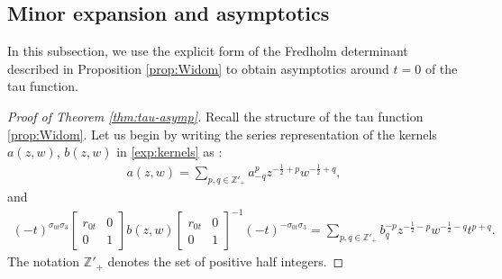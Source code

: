 \documentclass[a4paper,reqno,11pt]{amsart}
\numberwithin{equation}{section}
\numberwithin{figure}{section}
\theoremstyle{plain}
\theoremstyle{remark}
\numberwithin{rhp}{section}
\begin{document}
\subsection{Minor expansion and asymptotics}\label{subsec:proofminor}
In this subsection, we use the explicit form of the Fredholm determinant described in Proposition \ref{prop:Widom} to obtain asymptotics around $t=0$ of the tau function. 

\begin{proof}[Proof of Theorem \ref{thm:tau-asymp}]
   
Recall the structure of the tau function \eqref{prop:Widom}.
Let us begin by writing the series representation of the kernels $a(z,w)$, $b(z,w)$ in \eqref{exp:kernels} as \cite{GavrylenkoLisovyi2017,CGL2017}:
\begin{align}\label{minordef:a}
    a(z,w) = \sum_{p,q\in \mathbb{Z}'_{+}} a^{p}_{-q} z^{-\frac{1}{2}+p} w^{-\frac{1}{2}+q},
\end{align}
and
\begin{align}\label{minordef:b}
     (-t)^{\sigma_{0t} \sigma_3} \begin{bmatrix}
         r_{0t} & 0 \\
         0 & 1
     \end{bmatrix}b(z,w)\begin{bmatrix}
         r_{0t} & 0 \\
         0 & 1
     \end{bmatrix}^{-1}(-t)^{-\sigma_{0t} \sigma_3} = \sum_{p,q\in \mathbb{Z}'_{+}} b^{-p}_{q} z^{-\frac{1}{2}-p} w^{-\frac{1}{2}-q} t^{p+q}. 
\end{align}
The notation $\mathbb{Z}'_{+}$ denotes the set of positive half integers.




\end{proof}
\end{document}
